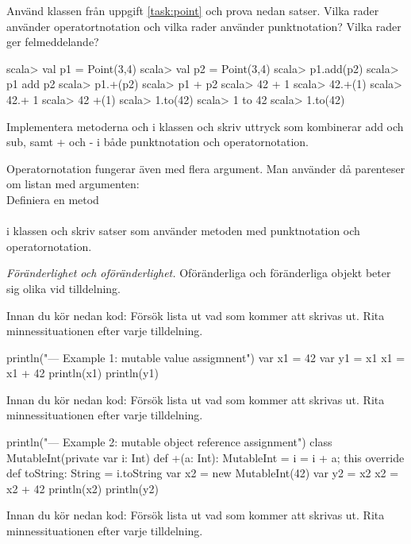 \Subtask Använd klassen  från uppgift \ref{task:point} och prova nedan satser. Vilka rader använder operatortnotation och vilka rader använder punktnotation? Vilka rader ger felmeddelande?
\begin{REPL}
scala> val p1 = Point(3,4)
scala> val p2 = Point(3,4)
scala> p1.add(p2)
scala> p1 add p2
scala> p1.+(p2)
scala> p1 + p2
scala> 42 + 1
scala> 42.+(1)
scala> 42.+ 1
scala> 42 +(1)
scala> 1.to(42)
scala> 1 to 42
scala> 1.to(42)
\end{REPL}

\Subtask Implementera metoderna  och \code{-} i klassen  och skriv uttryck som kombinerar add och sub, samt + och - i både punktnotation och operatornotation.

\Subtask Operatornotation fungerar även med flera argument. Man använder då parenteser om listan med argumenten: 
  \\
Definiera en metod \\
 \\ 
i klassen  och skriv satser som använder metoden med punktnotation och operatornotation. 





\Task \emph{Föränderlighet och oföränderlighet.} Oföränderliga och föränderliga objekt beter sig olika vid tilldelning.  

\Subtask\Pen Innan du kör nedan kod: Försök lista ut vad som kommer att skrivas ut. Rita minnessituationen efter varje tilldelning. 

\begin{Code}
println("\n--- Example 1: mutable value assigmnent")
var x1 = 42
var y1 = x1
x1 = x1 + 42
println(x1)
println(y1)
\end{Code}

\Subtask\Pen Innan du kör nedan kod: Försök lista ut vad som kommer att skrivas ut. Rita minnessituationen efter varje tilldelning.

\begin{Code}
println("\n--- Example 2: mutable object reference assignment")
class MutableInt(private var i: Int) {
  def +(a: Int): MutableInt = { i = i + a; this }
  override def toString: String = i.toString
}
var x2 = new MutableInt(42)
var y2 = x2
x2 = x2 + 42
println(x2)
println(y2)
\end{Code}

\Subtask\Pen Innan du kör nedan kod: Försök lista ut vad som kommer att skrivas ut. Rita minnessituationen efter varje tilldelning.

